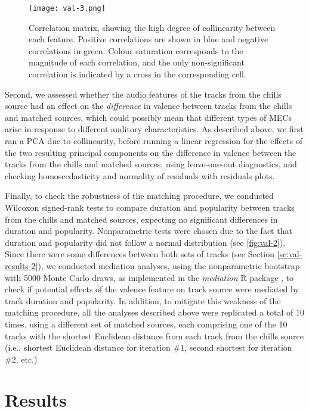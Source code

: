 \begin{figure}[t!]
\texttt{[image: val-3.png]}
\centering
\caption{Correlation matrix, showing the high degree of collinearity between each feature. Positive correlations are shown in blue and negative correlations in green. Colour saturation corresponds to the magnitude of each correlation, and the only non-significant correlation is indicated by a cross in the corresponding cell.}
\label{fig:val-3}
\end{figure}

Second, we assessed whether the audio features of the tracks from the chills source had an effect on the \emph{difference} in valence between tracks from the chills and matched sources, which could possibly mean that different types of MECs arise in response to different auditory characteristics. As described above, we first ran a PCA due to collinearity, before running a linear regression for the effects of the two resulting principal components on the difference in valence between the tracks from the chills and matched sources, using leave-one-out diagnostics, and checking homoscedasticity and normality of residuals with residuals plots.

Finally, to check the robustness of the matching procedure, we conducted Wilcoxon signed-rank tests to compare duration and popularity between tracks from the chills and matched sources, expecting no significant differences in duration and popularity. Nonparametric tests were chosen due to the fact that duration and popularity did not follow a normal distribution (see \autoref{fig:val-2}). Since there were some differences between both sets of tracks (see Section \ref{se:val-results-2}), we conducted mediation analyses, using the nonparametric bootstrap with 5000 Monte Carlo draws, as implemented in the \emph{mediation} R package \parencite{tingley2014}, to check if potential effects of the valence feature on track source were mediated by track duration and popularity. In addition, to mitigate this weakness of the matching procedure, all the analyses described above were replicated a total of 10 times, using a different set of matched sources, each comprising one of the 10 tracks with the shortest Euclidean distance from each track from the chills source (i.e., shortest Euclidean distance for iteration \#1, second shortest for iteration \#2, etc.)

\section{Results}
\label{se:val-results}

